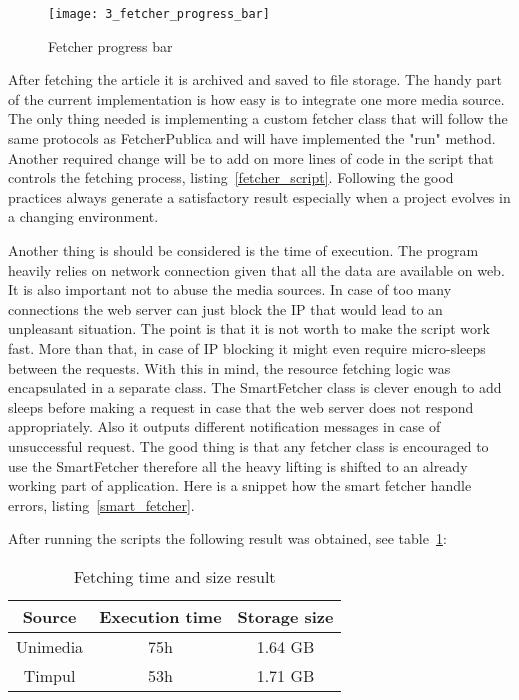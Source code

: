 \begin{figure}[!ht]
\centering
\texttt{[image: 3\_fetcher\_progress\_bar]}
\caption{Fetcher progress bar}\label{fetcher_progress_bar}
\end{figure}

After fetching the article it is archived and saved to file storage. The handy part of the current implementation is how easy is to integrate one more media source. The only thing needed is implementing a custom fetcher class that will follow the same protocols as FetcherPublica and will have implemented the "run" method. Another required change will be to add on more lines of code in the script that controls the fetching process, \mbox{listing \ref{fetcher_script}}. Following the good practices always generate a satisfactory result especially when a project evolves in a changing environment.





Another thing is should be considered is the time of execution. The program heavily relies on network connection given that all the data are available on web. It is also important not to abuse the media sources. In case of too many connections the web server can just block the IP that would lead to an unpleasant situation. The point is that it is not worth to make the script work fast. More than that, in case of IP blocking it might even require micro-sleeps between the requests. With this in mind, the resource fetching logic was encapsulated in a separate class. The SmartFetcher class is clever enough to add sleeps before making a request in case that the web server does not respond appropriately. Also it outputs different notification messages in case of unsuccessful request. The good thing is that any fetcher class is encouraged to use the SmartFetcher therefore all the heavy lifting is shifted to an already working part of application. Here is a snippet how the smart fetcher handle errors, \mbox{listing \ref{smart_fetcher}}.



After running the scripts the following result was obtained, see \mbox{table \ref{fetcher_result}}:
\begin{table}[!h]
  \begin{center}
    \caption{Fetching time and size result}
    \begin{tabular}{|c c c |}
      \hline
        Source & Execution time & Storage size \\ [0.5ex] 
      \hline
        Unimedia & 75h & 1.64 GB \\
      \hline
        Timpul & 53h & 1.71 GB \\
      \hline
    \end{tabular}
    \label{fetcher_result}
  \end{center}
  \vspace{-2.5em}
\end{table}

